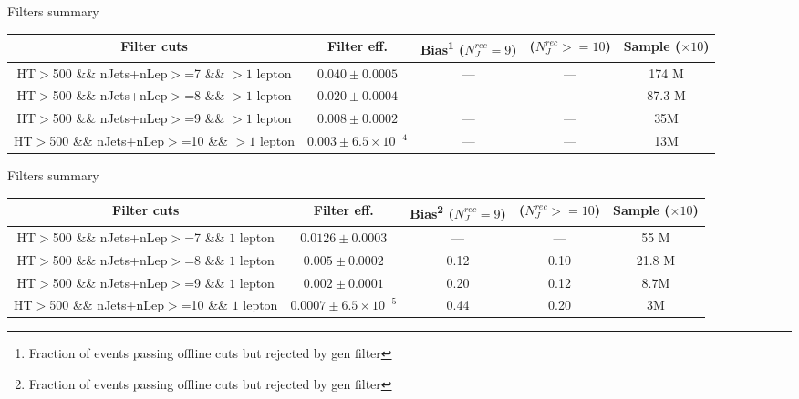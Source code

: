 \documentclass{beamer}
\begin{document}
\begin{frame}{Filters summary}
\begin{center}
{\tiny \begin{tabular}{|c|c|c|c|c|}
\hline Filter cuts & Filter eff. & Bias\footnote{Fraction of events passing offline cuts but rejected by gen filter}  ($N_J^{rec}=9$)&  ($N_J^{rec}>=10$)&  Sample ($\times 10$) \\ 
\hline \thead{HT$>$500 \\ \&\& nJets+nLep$>$=7 \\ \&\& $>1$ lepton} & $0.040 \pm 0.0005$  & --- & --- & 174 M\\ 
\hline \thead{HT$>$500 \\ \&\& nJets+nLep$>$=8 \\ \&\& $>1$ lepton} & $0.020 \pm 0.0004$  & --- & --- & 87.3 M\\ 
\hline \thead{HT$>$500 \\ \&\& nJets+nLep$>$=9 \\ \&\& $>1$ lepton} & $0.008 \pm 0.0002$  & --- & --- & 35M\\ 
\hline \thead{HT$>$500 \\ \&\& nJets+nLep$>$=10 \\ \&\& $>1$ lepton} & $0.003 \pm 6.5\times 10^{-4}$  & --- & --- & 13M\\
\hline 
\end{tabular} }
\end{center}
\end{frame}

\begin{frame}{Filters summary}
\begin{center}
{\tiny \begin{tabular}{|c|c|c|c|c|}
\hline Filter cuts & Filter eff. & Bias\footnote{Fraction of events passing offline cuts but rejected by gen filter}  ($N_J^{rec}=9$)&  ($N_J^{rec}>=10$)&  Sample ($\times 10$) \\ 
\hline \thead{HT$>$500 \\ \&\& nJets+nLep$>$=7 \\ \&\& $1$ lepton} & $0.0126 \pm 0.0003$  & --- & --- & 55 M\\ 
\hline \thead{HT$>$500 \\ \&\& nJets+nLep$>$=8 \\ \&\& $1$ lepton} & $0.005 \pm 0.0002$  & 0.12 & 0.10 & 21.8 M\\ 
\hline \thead{HT$>$500 \\ \&\& nJets+nLep$>$=9 \\ \&\& $1$ lepton} & $0.002 \pm 0.0001$  & 0.20 & 0.12 & 8.7M\\ 
\hline \thead{HT$>$500 \\ \&\& nJets+nLep$>$=10 \\ \&\& $1$ lepton} & $0.0007 \pm 6.5\times 10^{-5}$  & 0.44 & 0.20 & 3M\\
\hline 
\end{tabular} }
\end{center}
\end{frame}
\end{document}
